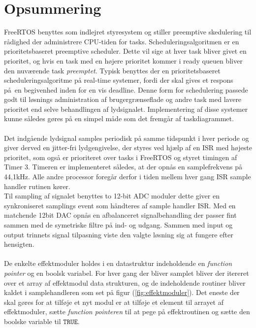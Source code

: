 \section{Opsummering}

FreeRTOS benyttes som indlejret styresystem og stiller preemptive skedulering til rådighed der administrere CPU-tiden for tasks. 
Scheduleringsalgoritmen er en prioritetsbaseret preemptive scheduler.
Dette vil sige at hver task bliver givet en prioritet, og hvis en task med en højere prioritet kommer i ready queuen bliver den nuværende task \textit{preemptet}.
Typisk benyttes der en prioritetsbaseret scheduleringsalgoritme på real-time systemer, fordi der skal gives et respons på en begivenhed inden for en vis deadline.
Denne form for schedulering passede godt til løsnings administration af brugergrænseflade og andre task med lavere prioritet end selve behandlingen af lydsignalet. 
Implementering af disse systemer kunne således gøres på en simpel måde som det fremgår af taskdiagrammet.
\\
\\
Det indgående lydsignal samples periodisk på samme tidspunkt i hver periode og giver derved en jitter-fri lydgengivelse, der
styres ved hjælp af en ISR med højeste prioritet, som også er prioriteret over tasks i FreeRTOS og styret timingen af Timer 3.
Timeren er implementeret således, at der opnås en samplefrekvens på 44,1kHz. 
Alle andre processor foregår derfor i tiden mellem hver gang ISR sample handler rutinen kører. 
\\
Til sampling af signalet benyttes to 12-bit ADC moduler dette giver en synkroniseret samplings event som håndteres af sample handler ISR.
Med en matchende 12bit DAC opnås en afbalanceret signalbehandling der passer fint sammen med de symetriske filtre på ind- og udgang.
Sammen med input og output trinnets signal tilpasning viste den valgte løsning sig at fungere efter hensigten.
\\
\\
De enkelte effektmoduler holdes i en datastruktur indeholdende en \textit{function pointer} og en boolsk variabel.
For hver gang der bliver samplet bliver der itereret over et array af effektmodul data strukturen, og de indeholdende routiner bliver kaldet i samplehandleren som set på figur (\ref{fig:effektmoduler}).\newline
Det eneste der skal gøres for at tilføje et nyt modul er at tilføje et element til arrayet af effektmoduler, sætte \textit{function pointeren} til at pege på effektroutinen og sætte den boolske variable til $\mathtt{TRUE}$.
